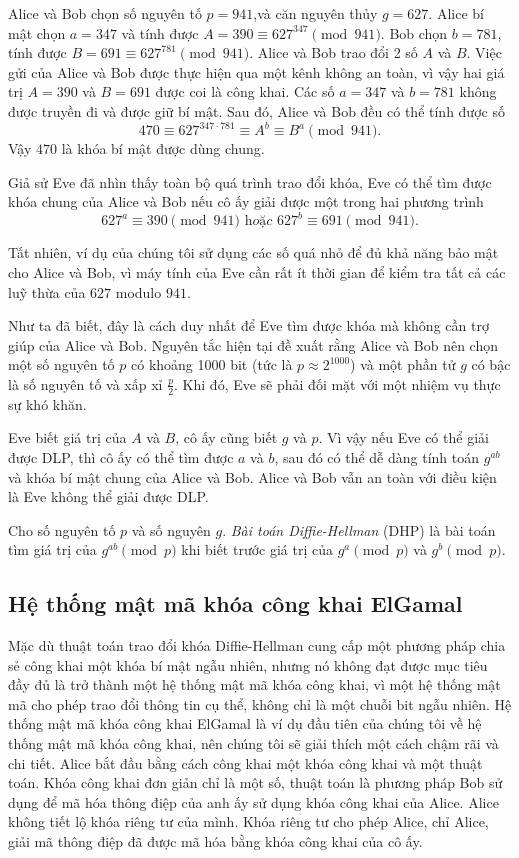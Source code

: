 \begin{example}
	Alice và Bob chọn số nguyên tố $p = 941$,và căn nguyên thủy $g = 627$.
	Alice bí mật chọn $a= 347$ và tính được $A = 390 \equiv 627^{347} \pmod{941}$. Bob chọn $b= 781$, tính được $B = 691 \equiv 627^{781} \pmod{941}$. Alice và Bob trao đổi 2 số $A$ và $B$. Việc gửi của Alice và Bob được
	thực hiện qua một kênh không an toàn, vì vậy hai giá trị $A = 390$ và $B = 691$
	được coi là công khai. Các số $a = 347$ và $b = 781$ không được
	truyền đi và được giữ bí mật. Sau đó, Alice và Bob đều có thể tính được số
	$$ 470 \equiv 627 ^{347 \cdot 781} \equiv A^b \equiv B^a \pmod{941}.$$
	Vậy $470$ là khóa bí mật được dùng chung.
\end{example}
Giả sử Eve đã nhìn thấy toàn bộ quá trình trao đổi khóa, Eve có thể tìm được khóa chung của Alice và Bob nếu cô ấy giải được một trong hai phương trình
$$627^a \equiv 390 \pmod{941} \textit{ hoặc } 627^b \equiv 691 \pmod{941}.$$


Tất nhiên, ví dụ của chúng tôi sử dụng các số quá nhỏ để đủ khả năng bảo
mật cho Alice và Bob, vì máy tính của Eve cần rất ít thời gian để kiểm
tra tất cả các luỹ thừa của $627$ modulo $941$.

Như ta đã biết, đây là cách duy nhất để Eve tìm được khóa mà không cần trợ giúp của Alice và Bob. Nguyên tắc hiện tại đề xuất rằng
Alice và Bob nên chọn một số nguyên tố $p$ có khoảng 1000 bit (tức là $p \approx 2^{1000}$) và
một phần tử $g$ có bậc là số nguyên tố và xấp xỉ $\frac{p}{2}$. Khi đó, Eve sẽ phải đối mặt với một nhiệm vụ thực sự khó khăn.

Eve biết giá trị của $A$ và $B$, cô ấy cũng biết $g$ và $p$.
Vì vậy nếu Eve có thể giải được DLP, thì cô ấy
có thể tìm được $a$ và $b$, sau đó có thể dễ dàng tính toán $g^{ab}$ và khóa bí mật
chung của Alice và Bob. Alice và Bob vẫn an toàn với điều kiện là Eve
không thể giải được DLP.

\begin{definition}
	Cho số nguyên tố $p$ và số nguyên $g$. \textit{Bài toán Diffie-Hellman} (DHP) là bài toán tìm giá trị của $g^{ab} \pmod{p}$ khi biết trước giá trị của $g^a \pmod{p}$ và $g^b \pmod{p}$.
\end{definition}

\subsection{Hệ thống mật mã khóa công khai ElGamal}
Mặc dù thuật toán trao đổi khóa Diffie-Hellman cung cấp một phương pháp
chia sẻ công khai một khóa bí mật ngẫu nhiên, nhưng nó không đạt được mục
tiêu đầy đủ là trở thành một hệ thống mật mã khóa công khai, vì một hệ thống
mật mã cho phép trao đổi thông tin cụ thể, không chỉ là một chuỗi bit ngẫu
nhiên.
Hệ thống mật mã khóa công khai ElGamal là ví dụ đầu tiên của chúng tôi về
hệ thống mật mã khóa công khai, nên chúng tôi sẽ giải thích một cách chậm rãi và chi tiết. Alice bắt đầu bằng cách công khai một khóa công khai và một thuật toán. Khóa công khai đơn giản chỉ là một số, thuật toán là phương pháp Bob sử dụng để mã hóa thông điệp của anh ấy sử dụng khóa công khai của Alice.
Alice không tiết lộ khóa riêng tư của mình. Khóa riêng tư cho phép Alice, chỉ Alice, giải mã thông điệp đã được mã hóa bằng khóa công khai của cô ấy.

